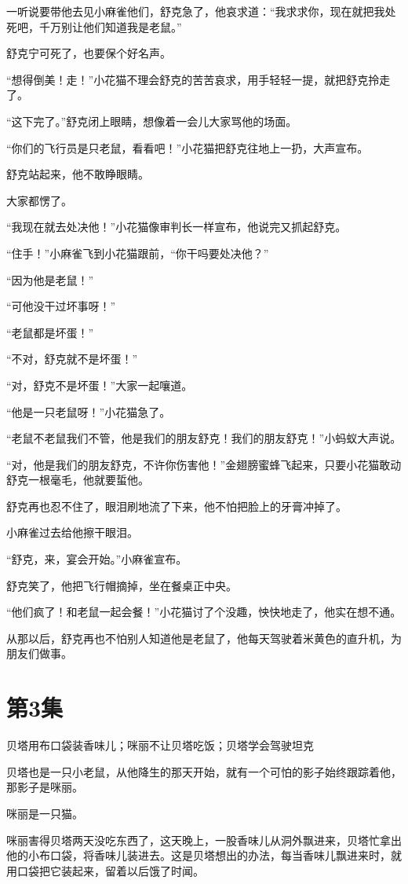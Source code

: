 \documentclass[a4paper,12pt,UTF8,twoside]{ctexbook}
\begin{document}
一听说要带他去见小麻雀他们，舒克急了，他哀求道：“我求求你，现在就把我处死吧，千万别让他们知道我是老鼠。”

舒克宁可死了，也要保个好名声。

“想得倒美！走！”小花猫不理会舒克的苦苦哀求，用手轻轻一提，就把舒克拎走了。

“这下完了。”舒克闭上眼睛，想像着一会儿大家骂他的场面。

“你们的飞行员是只老鼠，看看吧！”小花猫把舒克往地上一扔，大声宣布。

舒克站起来，他不敢睁眼睛。

大家都愣了。

“我现在就去处决他！”小花猫像审判长一样宣布，他说完又抓起舒克。

“住手！”小麻雀飞到小花猫跟前，“你干吗要处决他？”

“因为他是老鼠！”

“可他没干过坏事呀！”

“老鼠都是坏蛋！”

“不对，舒克就不是坏蛋！”

“对，舒克不是坏蛋！”大家一起嚷道。

“他是一只老鼠呀！”小花猫急了。

“老鼠不老鼠我们不管，他是我们的朋友舒克！我们的朋友舒克！”小蚂蚁大声说。

“对，他是我们的朋友舒克，不许你伤害他！”金翅膀蜜蜂飞起来，只要小花猫敢动舒克一根毫毛，他就要蜇他。

舒克再也忍不住了，眼泪刷地流了下来，他不怕把脸上的牙膏冲掉了。

小麻雀过去给他擦干眼泪。

“舒克，来，宴会开始。”小麻雀宣布。

舒克笑了，他把飞行帽摘掉，坐在餐桌正中央。

“他们疯了！和老鼠一起会餐！”小花猫讨了个没趣，怏快地走了，他实在想不通。

从那以后，舒克再也不怕别人知道他是老鼠了，他每天驾驶着米黄色的直升机，为朋友们做事。

\chapter{第3集} 

贝塔用布口袋装香味儿；咪丽不让贝塔吃饭；贝塔学会驾驶坦克

贝塔也是一只小老鼠，从他降生的那天开始，就有一个可怕的影子始终跟踪着他，那影子是咪丽。

咪丽是一只猫。

咪丽害得贝塔两天没吃东西了，这天晚上，一股香味儿从洞外飘进来，贝塔忙拿出他的小布口袋，将香味儿装进去。这是贝塔想出的办法，每当香味儿飘进来时，就用口袋把它装起来，留着以后饿了时闻。
\end{document}

